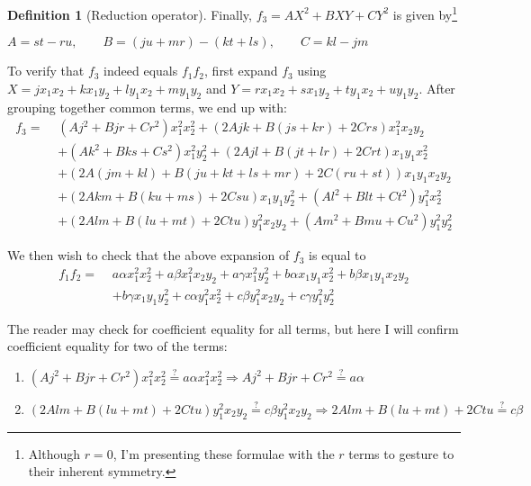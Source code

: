 \documentclass{article}
\theoremstyle{definition}
\newtheorem{definition}{Definition}[section]
\theoremstyle{theorem}
\theoremstyle{example}
\theoremstyle{corollary}
\begin{document}
\begin{definition}[Reduction operator]
\bigskip

Finally, \(f_{3} = A X^{2} + B X Y + C Y^{2}\) is given by\footnote{Although \(r = 0\), I'm presenting these formulae with the \(r\) terms to gesture to their inherent symmetry.}
\begin{center}
\(A = s t - r u, \quad \quad B = (j u + m r) - (k t + l s), \quad \quad C = k l - j m\)
\end{center}

\bigskip

To verify that \(f_{3}\) indeed equals \(f_{1} f_{2}\), first expand \(f_{3}\) using \(X = j x_{1} x_{2} + k x_{1} y_{2} + l y_{1} x_{2} + m y_{1} y_{2}\) and \(Y = r x_{1} x_{2} + s x_{1} y_{2} + t y_{1} x_{2} + u y_{1} y_{2}\). After grouping together common terms, we end up with:
\begin{align*}
f_{3} = \, \, & (A j^{2} + B j r + C r^{2}) x_{1}^{2} x_{2}^{2} + (2 A j k + B (j s + k r) + 2 C r s) x_{1}^{2} x_{2} y_{2} \\
& + (A k^{2} + B k s + C s^{2}) x_{1}^{2} y_{2}^{2} + (2 A j l + B (j t + l r) + 2 C r t) x_{1} y_{1} x_{2}^{2} \\
&+ (2 A (j m + k l) + B ( j u + k t + l s + m r) + 2 C (r u + s t)) x_{1} y_{1} x_{2} y_{2} \\
&+ (2 A k m + B (k u + m s) + 2 C s u) x_{1} y_{1} y_{2}^{2} + (A l^{2} + B l t + C t^{2}) y_{1}^{2} x_{2}^{2} \\
&+ (2 A l m + B (l u + m t) + 2 C t u) y_{1}^{2} x_{2} y_{2} + (A m^{2} + B m u + C u^{2}) y_{1}^{2} y_{2}^{2}
\end{align*}

\bigskip

We then wish to check that the above expansion of \(f_{3}\) is equal to
\begin{align*}
f_{1} f_{2} = \, \, & a \alpha x_{1}^{2} x_{2}^{2} + a \beta x_{1}^{2} x_{2} y_{2} + a \gamma x_{1}^{2} y_{2}^{2} + b \alpha x_{1} y_{1} x_{2}^{2} + b \beta x_{1} y_{1} x_{2} y_{2} \\
&+ b \gamma x_{1} y_{1} y_{2}^{2} + c \alpha y_{1}^{2} x_{2}^{2} + c \beta y_{1}^{2} x_{2} y_{2} + c \gamma y_{1}^{2} y_{2}^{2}
\end{align*}

\bigskip

The reader may check for coefficient equality for all terms, but here I will confirm coefficient equality for two of the terms:
\begin{enumerate}
\item \((A j^{2} + B j r + C r^{2}) x_{1}^{2} x_{2}^{2} \stackrel{?}{=} a \alpha x_{1}^{2} x_{2}^{2} \Rightarrow A j^{2} + B j r + C r^{2} \stackrel{?}{=} a \alpha\)
\item \((2 A l m + B (l u + m t) + 2 C t u) y_{1}^{2} x_{2} y_{2} \stackrel{?}{=} c \beta y_{1}^{2} x_{2} y_{2} \Rightarrow 2 A l m + B (l u + m t) + 2 C t u \stackrel{?}{=} c \beta\)
\end{enumerate}


\end{definition}
\end{document}
